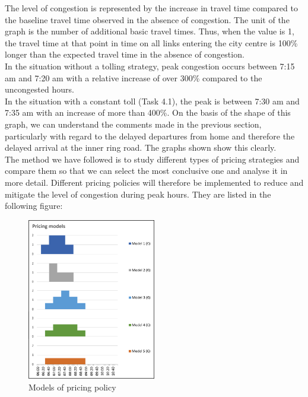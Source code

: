 \documentclass[a4paper, 12pt,oneside]{article}
\begin{document}
The level of congestion is represented by the increase in travel time compared to the baseline travel time observed in the absence of congestion. The unit of the graph is the number of additional basic travel times. Thus, when the value is 1, the travel time at that point in time on all links entering the city centre is 100\% longer than the expected travel time in the absence of congestion.\\
In the situation without a tolling strategy, peak congestion occurs between 7:15 am and 7:20 am with a relative increase of over 300\% compared to the uncongested hours.\\
In the situation with a constant toll (Task 4.1), the peak is between 7:30 am and 7:35 am with an increase of more than 400\%. On the basis of the shape of this graph, we can understand the comments made in the previous section, particularly with regard to the delayed departures from home and therefore the delayed arrival at the inner ring road. The graphs shown show this clearly.\\

The method we have followed is to study different types of pricing strategies and compare them so that we can select the most conclusive one and analyse it in more detail. Different pricing policies will therefore be implemented to reduce and mitigate the level of congestion during peak hours. They are listed in the following figure:

\begin{figure}[H]
    \centering
    \includegraphics[width=0.5\textwidth]{Images/Step4/Pricing policies.png}
    \caption{Models of pricing policy}
    \label{fig:Models of pricing policy}
\end{figure}
\end{document}
